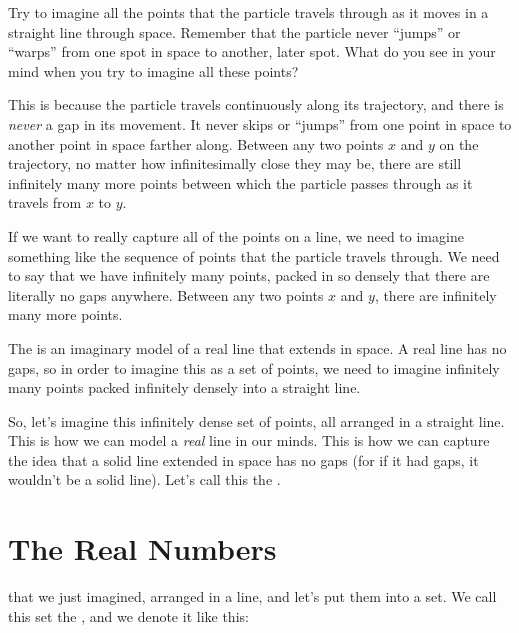 \documentclass[../../../main.tex]{subfiles}
\begin{document}
\begin{ponder}
  Try to imagine all the points that the particle travels through as it moves in a straight line through space. Remember that the particle never ``jumps'' or ``warps'' from one spot in space to another, later spot. What do you see in your mind when you try to imagine all these points?
\end{ponder}

This is because the particle travels continuously along its trajectory, and there is \emph{never} a gap in its movement. It never skips or ``jumps'' from one point in space to another point in space farther along. Between any two points $x$ and $y$ on the trajectory, no matter how infinitesimally close they may be, there are still infinitely many more points between which the particle passes through as it travels from $x$ to $y$. 

If we want to really capture all of the points on a line, we need to imagine something like the sequence of points that the particle travels through. We need to say that we have infinitely many points, packed in so densely that there are literally no gaps anywhere. Between any two points $x$ and $y$, there are infinitely many more points.

\begin{terminology}
  The  is an imaginary model of a real line that extends in space. A real line has no gaps, so in order to imagine this as a set of points, we need to imagine infinitely many points packed infinitely densely into a straight line.
\end{terminology}

So, let's imagine this infinitely dense set of points, all arranged in a straight line. This is how we can model a \emph{real} line in our minds. This is how we can capture the idea that a solid line extended in space has no gaps (for if it had gaps, it wouldn't be a solid line). Let's call this the .


\section{The Real Numbers}

 that we just imagined, arranged in a line, and let's put them into a set. We call this set the , and we denote it like this:
\end{document}
